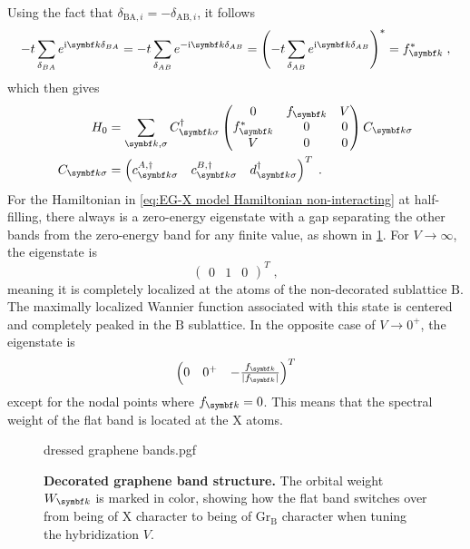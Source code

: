 \documentclass[../main.tex]{subfiles}
\begin{document}
Using the fact that \(\delta_{\mathrm{BA}, i} = -\delta_{\mathrm{AB}, i}\), it follows
\begin{align}
	-t \sum_{\delta_{BA}} e^{\iu \vb{k} \delta_{BA}} = -t \sum_{\delta_{AB}} e^{-\iu \vb{k} \delta_{AB}} = \left(-t \sum_{\delta_{AB}} e^{\iu \vb{k} \delta_{AB}}\right)^* = f_{\vb{k}}^* \;,
\end{align}
which then gives
\begin{align}
	H_0 &= \sum_{\vb{k}, \sigma} C_{\vb{k} \sigma}^{\dagger}
	\begin{pmatrix}
		0 & f_{\vb{k}} & V \\
		f_{\vb{k}}^* & 0 & 0 \\
		V & 0 & 0
	\end{pmatrix} C_{\vb{k} \sigma}
	\label{eq:decorated graphene Hamiltonian non-interacting matrix} \\
	C_{\vb{k} \sigma} &= \begin{pmatrix} c_{\vb{k} \sigma}^{A, \dagger} & c_{\vb{k} \sigma}^{B, \dagger} & d_{\vb{k} \sigma}^{\dagger} \end{pmatrix}^T \;.
\end{align}
For the Hamiltonian in \cref{eq:EG-X model Hamiltonian non-interacting} at half-filling, there always is a zero-energy eigenstate with a gap separating the other bands from the zero-energy band for any finite value, as shown in \cref{fig:decorated graphene model non-interacting bands}.
For \(V \to \infty\), the eigenstate is
\begin{equation}
	\begin{pmatrix} 0 & 1 & 0 \end{pmatrix}^T \;,
\end{equation}
meaning it is completely localized at the atoms of the non-decorated sublattice \(\mathrm{B}\).
The maximally localized Wannier function associated with this state is centered and completely peaked in the \(\mathrm{B}\) sublattice.
In the opposite case of \(V \to 0^+\), the eigenstate is
\begin{equation}
	\begin{pmatrix} 0 & 0^+ & -\frac{f_{\vb{k}}}{\vert f_{\vb{k}} \vert} \end{pmatrix}^T
\end{equation}
except for the nodal points where \(f_{\vb{k}} = 0\).
This means that the spectral weight of the flat band is located at the \(\mathrm{X}\) atoms.
\begin{figure}[t]
	\centering
	{dressed graphene bands.pgf}
	\caption[Decorated graphene band structure.]{\textbf{Decorated graphene band structure.} The orbital weight \(W_{\vb{k}}\) is marked in color, showing how the flat band switches over from being of \(\mathrm{X}\) character to being of \(\mathrm{Gr}_{\mathrm{B}}\) character when tuning the hybridization \(V\).}
	\label{fig:decorated graphene model non-interacting bands}
\end{figure}
\end{document}
